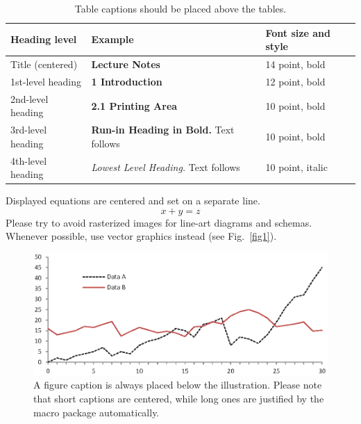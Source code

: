 \documentclass[runningheads]{llncs}
\begin{document}
\begin{table}
\caption{Table captions should be placed above the
tables.}\label{tab1}
\begin{tabular}{|l|l|l|}
\hline
Heading level &  Example & Font size and style\\
\hline
Title (centered) &  {\Large\bfseries Lecture Notes} & 14 point, bold\\
1st-level heading &  {\large\bfseries 1 Introduction} & 12 point, bold\\
2nd-level heading & {\bfseries 2.1 Printing Area} & 10 point, bold\\
3rd-level heading & {\bfseries Run-in Heading in Bold.} Text follows & 10 point, bold\\
4th-level heading & {\itshape Lowest Level Heading.} Text follows & 10 point, italic\\
\hline
\end{tabular}
\end{table}


\noindent Displayed equations are centered and set on a separate
line.
\begin{equation}
x + y = z
\end{equation}
Please try to avoid rasterized images for line-art diagrams and
schemas. Whenever possible, use vector graphics instead (see
Fig.~\ref{fig1}).

\begin{figure}
\includegraphics[width=\textwidth]{fig1.eps}
\caption{A figure caption is always placed below the illustration.
Please note that short captions are centered, while long ones are
justified by the macro package automatically.} \label{fig2}
\end{figure}
\end{document}
